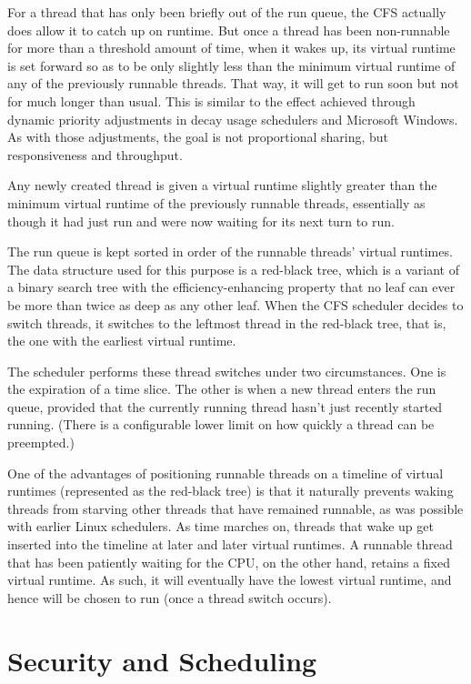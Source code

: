 For a thread that has only been briefly out of the run queue, the CFS actually does allow it to catch up on runtime.  But once a thread has been non-runnable
for more than a threshold amount of time, when it wakes up, its virtual runtime is set forward so as to be only slightly less than the minimum virtual runtime of any of the previously runnable threads.  That way, it will get to run soon but not for much longer than usual.  This is similar to the effect achieved through dynamic priority adjustments in decay usage schedulers and Microsoft Windows.  As with those adjustments, the goal is not proportional sharing, but responsiveness and throughput.

Any newly created thread is given a virtual runtime slightly greater than the minimum virtual runtime of the previously runnable threads, essentially as though it had just run and were now waiting for its next turn to run.

The run queue is kept sorted in order of the runnable threads' virtual runtimes.
The data structure used for this purpose is
a red-black tree, which is a variant of a
binary search tree with the efficiency-enhancing property that no leaf
can ever be more than twice as deep as any other leaf.
When the CFS scheduler decides to switch threads, it switches to the leftmost thread in the
red-black tree, that is, the one with the earliest virtual runtime.

The scheduler performs these thread switches under two
circumstances.  One is the expiration of a time slice.  The other is
when a new thread enters the run queue, provided that the currently
running thread hasn't just recently started running.  (There is a
configurable lower limit on how quickly a thread can be preempted.)

One of the advantages of positioning runnable threads on a timeline
of virtual runtimes (represented as the red-black tree) is that it
naturally prevents waking threads from starving other threads that
have remained runnable, as was possible with earlier Linux schedulers.
As time marches on, threads that wake up get inserted into
the timeline at later and later virtual runtimes.  A runnable thread that has been patiently
waiting for the CPU, on the other hand, retains a fixed virtual runtime.
As such, it will eventually have the lowest virtual runtime, and hence
will be chosen to run (once a thread switch occurs).


\section{Security and Scheduling}\label{scheduling-security-section}

